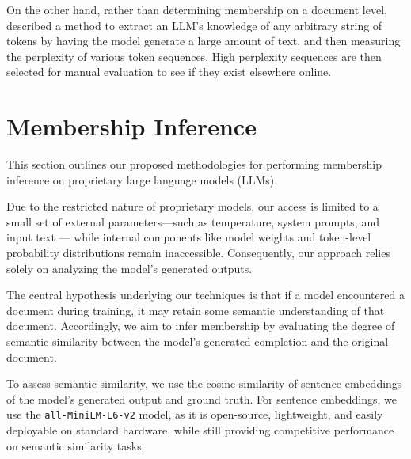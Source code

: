 \documentclass[sigconf]{acmart}
\newcommand{\todo}[1]{\textcolor{red}{\textbf{TODO:} #1}}
\begin{document}
On the other hand, rather than determining membership on a document level, \cite{extracting_training_data_llm} described a method to extract an LLM's knowledge of any arbitrary string of tokens by having the model generate a large amount of text, and then measuring the perplexity of various token sequences. High perplexity sequences are then selected for manual evaluation to see if they exist elsewhere online.





\section{Membership Inference}

This section outlines our proposed methodologies for performing membership inference on proprietary large language models (LLMs).

Due to the restricted nature of proprietary models, our access is limited to a small set of external parameters—such as temperature, system prompts, and input text --- while internal components like model weights and token-level probability distributions remain inaccessible. Consequently, our approach relies solely on analyzing the model’s generated outputs.

The central hypothesis underlying our techniques is that if a model encountered a document during training, it may retain some semantic understanding of that document. Accordingly, we aim to infer membership by evaluating the degree of semantic similarity between the model’s generated completion and the original document.

To assess semantic similarity, we use the cosine similarity of sentence embeddings of the model’s generated output and ground truth. For sentence embeddings, we use the \texttt{all-MiniLM-L6-v2} model, as it is open-source, lightweight, and easily deployable on standard hardware, while still providing competitive performance on semantic similarity tasks.
\end{document}
